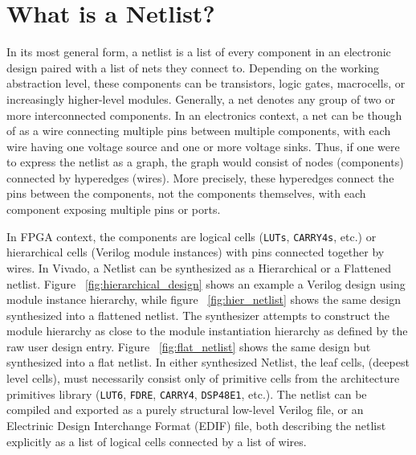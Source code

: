 
\section{What is a Netlist?}
\label{sec:netlist}
In its most general form, a netlist is a list of every component in an electronic design paired with a list of nets they connect to. 
Depending on the working abstraction level, these components can be transistors, logic gates, macrocells, or increasingly higher-level modules. 
Generally, a net denotes any group of two or more interconnected components.
In an electronics context, a net can be though of as a wire connecting multiple pins between multiple components, with each wire having one voltage source and one or more voltage sinks. 
Thus, if one were to express the netlist as a graph, the graph would consist of nodes (components) connected by hyperedges (wires). 
More precisely, these hyperedges connect the pins between the components, not the components themselves, with each component exposing multiple pins or ports. 

In FPGA context, the components are logical cells (\texttt{LUTs}, \texttt{CARRY4s}, etc.) or hierarchical cells (Verilog module instances) with pins connected together by wires. 
In Vivado, a Netlist can be synthesized as a Hierarchical or a Flattened netlist. 
Figure ~\ref{fig:hierarchical_design} shows an example a Verilog design using module instance hierarchy, while figure ~\ref{fig:hier_netlist} shows the same design synthesized into a flattened netlist. 
The synthesizer attempts to construct the module hierarchy as close to the module instantiation hierarchy as defined by the raw user design entry. 
Figure ~\ref{fig:flat_netlist} shows the same design but synthesized into a flat netlist. 
In either synthesized Netlist, the leaf cells, (deepest level cells), must necessarily consist only of primitive cells from the architecture primitives library (\texttt{LUT6}, \texttt{FDRE}, \texttt{CARRY4}, \texttt{DSP48E1}, etc.). 
The netlist can be compiled and exported as a purely structural low-level Verilog file, or an Electrinic Design Interchange Format (EDIF) file, both describing the netlist explicitly as a list of logical cells connected by a list of wires. 

